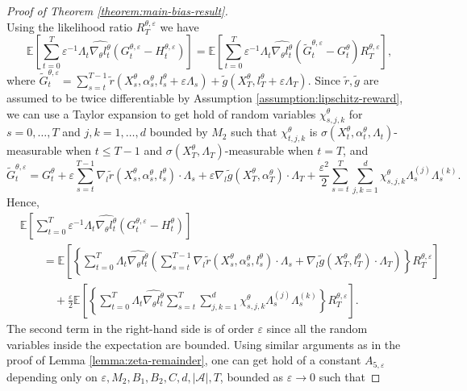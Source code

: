 \documentclass[11pt]{article}
\numberwithin{equation}{section}
\theoremstyle{definition}
\theoremstyle{remark}
\def\eps{\varepsilon}
\def\cA{\mathcal{A}}
\begin{document}
\begin{proof}[Proof of Theorem \ref{theorem:main-bias-result}]
\[\]
Using the likelihood ratio $R_T^{\theta, \eps}$ we have
\[
\mathbb E \left[\sum_{t=0}^{T} \eps^{-1} \Lambda_t \widehat{\nabla_\theta l^\theta_t} (G_t^{\theta, \eps} - H_t^{\theta, \eps}) \right] = \mathbb E \left[\sum_{t=0}^{T} \eps^{-1} \Lambda_t \widehat{\nabla_\theta l^\theta_t} (\tilde G_t^{\theta, \eps} - G_t^{\theta}) R_T^{\theta, \eps} \right],
\]
where $\tilde G_t^{\theta, \eps} = \sum_{s=t}^{T-1} \tilde r(X_s^{\theta}, \alpha_s^{\theta}, l_s^{\theta} + \eps \Lambda_s) + \tilde g(X_T^{\theta}, l_T^{\theta} + \eps \Lambda_T)$.
Since $\tilde r, \tilde g$ are assumed to be twice differentiable by Assumption \ref{assumption:lipschitz-reward}, we can use a Taylor expansion to get hold of random variables 
$\chi^\theta_{s,j,k}$ for $s=0, \ldots, T$ and $j,k = 1, \ldots, d$ bounded by $M_2$ such that $\chi^\theta_{t,j,k}$ is $\sigma(X^\theta_t, \alpha_t^\theta, \Lambda_t)$-measurable when $t \leq T-1$ 
and $\sigma (X_T^\theta, \Lambda_T)$-measurable when $t = T$, and
\[
\tilde G_t^{\theta, \eps} = G_t^\theta + \eps \sum_{s = t}^{T-1} \nabla_l \tilde r(X_s^\theta, \alpha_s^\theta, l_s^\theta) \cdot \Lambda_s + \eps \nabla_l \tilde g(X_T^\theta, \alpha_T^\theta) \cdot \Lambda_T
 + \frac{\eps^2}{2} \sum_{s=t}^{T}\sum_{j,k=1}^d \chi^\theta_{s,j,k} \Lambda_s^{(j)} \Lambda_s^{(k)}.
\]
Hence, 
\begin{equation}
    \label{eq:decomposition-md-approx}
\begin{aligned}
    &\mathbb E \left[\sum_{t=0}^{T} \eps^{-1} \Lambda_t \widehat{\nabla_\theta l^\theta_t} (G_t^{\theta, \eps} - H_t^{\theta}) \right] \\
    &\qquad = \mathbb E \left[ \left\{\sum_{t=0}^{T} \Lambda_t \widehat{\nabla_\theta l^\theta_t} \left(\sum_{s=t}^{T-1}\nabla_l \tilde r(X_s^\theta, \alpha_s^\theta, l_s^\theta) \cdot \Lambda_s 
    + \nabla_l \tilde g(X_T^\theta, l_T^\theta) \cdot \Lambda_T\right)  \right\} R_T^{\theta, \eps}\right] \\
    & \qquad \quad + \frac{\eps}{2}\mathbb E \left[ \left\{\sum_{t=0}^{T} \Lambda_t \widehat{\nabla_\theta l^\theta_t} \sum_{s=t}^{T}\sum_{j,k=1}^d \chi^\theta_{s,j,k} \Lambda_s^{(j)} \Lambda_s^{(k)} \right\} R_T^{\theta, \eps}\right].
\end{aligned}
\end{equation}
The second term in the right-hand side is of order $\eps$ since all the random variables inside the expectation are bounded.
 Using similar arguments as in the proof of Lemma \ref{lemma:zeta-remainder}, one can get hold of a constant $A_{5,\eps}$ depending only on $\eps, M_2, B_1,B_2, C, d, | \cA |, T$, bounded as $\eps \to 0$ such that 

\end{proof}
\end{document}
